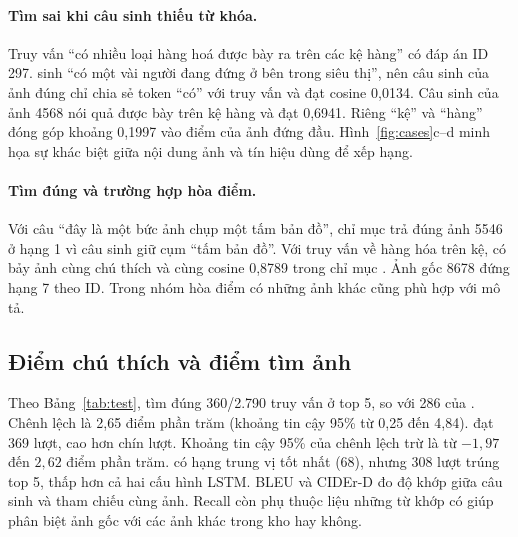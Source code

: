 \paragraph{Tìm sai khi câu sinh thiếu từ khóa.}
Truy vấn “có nhiều loại hàng hoá được bày ra trên các kệ hàng” có đáp án ID 297. \modelB{} sinh “có một vài người đang đứng ở bên trong siêu thị”, nên câu sinh của ảnh đúng chỉ chia sẻ token “có” với truy vấn và đạt cosine 0,0134. Câu sinh của ảnh 4568 nói quả được bày trên kệ hàng và đạt 0,6941. Riêng “kệ” và “hàng” đóng góp khoảng 0,1997 vào điểm của ảnh đứng đầu. Hình~\ref{fig:cases}c--d minh họa sự khác biệt giữa nội dung ảnh và tín hiệu dùng để xếp hạng.

\paragraph{Tìm đúng và trường hợp hòa điểm.}
Với câu “đây là một bức ảnh chụp một tấm bản đồ”, chỉ mục \modelA{} trả đúng ảnh 5546 ở hạng 1 vì câu sinh giữ cụm “tấm bản đồ”. Với truy vấn về hàng hóa trên kệ, có bảy ảnh cùng chú thích và cùng cosine 0,8789 trong chỉ mục \modelA{}. Ảnh gốc 8678 đứng hạng 7 theo ID. Trong nhóm hòa điểm có những ảnh khác cũng phù hợp với mô tả.

\subsection{Điểm chú thích và điểm tìm ảnh}

Theo Bảng~\ref{tab:test}, \modelA{} tìm đúng 360/2.790 truy vấn ở top 5, so với 286 của \modelB{}. Chênh lệch là 2,65 điểm phần trăm (khoảng tin cậy 95\% từ 0,25 đến 4,84). \modelAz{} đạt 369 lượt, cao hơn \modelA{} chín lượt. Khoảng tin cậy 95\% của chênh lệch \modelAz{} trừ \modelA{} là từ $-1{,}97$ đến $2{,}62$ điểm phần trăm. \modelC{} có hạng trung vị tốt nhất (68), nhưng 308 lượt trúng top 5, thấp hơn cả hai cấu hình LSTM. BLEU và CIDEr-D đo độ khớp giữa câu sinh và tham chiếu cùng ảnh. Recall còn phụ thuộc liệu những từ khớp có giúp phân biệt ảnh gốc với các ảnh khác trong kho hay không.
